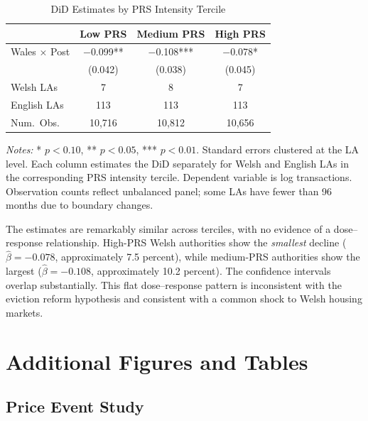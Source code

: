 \documentclass[12pt]{article}
\begin{document}
\begin{table}[H]
\centering
\caption{DiD Estimates by PRS Intensity Tercile}
\label{tab:prs_terciles}
\begin{threeparttable}
\begin{tabular}{lccc}
\toprule
& Low PRS & Medium PRS & High PRS \\
\midrule
Wales $\times$ Post & $-$0.099** & $-$0.108*** & $-$0.078* \\
& (0.042) & (0.038) & (0.045) \\[4pt]
Welsh LAs & 7 & 8 & 7 \\
English LAs & 113 & 113 & 113 \\
Num.\ Obs. & 10,716 & 10,812 & 10,656 \\
\bottomrule
\end{tabular}
\begin{tablenotes}[flushleft]
\small
\item \textit{Notes:} * $p<0.10$, ** $p<0.05$, *** $p<0.01$. Standard errors clustered at the LA level. Each column estimates the DiD separately for Welsh and English LAs in the corresponding PRS intensity tercile. Dependent variable is log transactions. Observation counts reflect unbalanced panel; some LAs have fewer than 96 months due to boundary changes.
\end{tablenotes}
\end{threeparttable}
\end{table}

The estimates are remarkably similar across terciles, with no evidence of a dose--response relationship. High-PRS Welsh authorities show the \textit{smallest} decline ($\hat{\beta} = -0.078$, approximately 7.5 percent), while medium-PRS authorities show the largest ($\hat{\beta} = -0.108$, approximately 10.2 percent). The confidence intervals overlap substantially. This flat dose--response pattern is inconsistent with the eviction reform hypothesis and consistent with a common shock to Welsh housing markets.


\section{Additional Figures and Tables}
\label{app:exhibits}

\subsection{Price Event Study}
\end{document}
